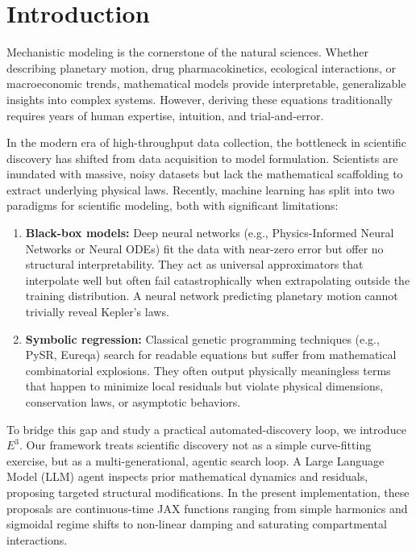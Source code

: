 \section{Introduction}
\label{sec:intro}

Mechanistic modeling is the cornerstone of the natural sciences. Whether describing planetary motion, drug pharmacokinetics, ecological interactions, or macroeconomic trends, mathematical models provide interpretable, generalizable insights into complex systems. However, deriving these equations traditionally requires years of human expertise, intuition, and trial-and-error.

In the modern era of high-throughput data collection, the bottleneck in scientific discovery has shifted from data acquisition to model formulation. Scientists are inundated with massive, noisy datasets but lack the mathematical scaffolding to extract underlying physical laws. Recently, machine learning has split into two paradigms for scientific modeling, both with significant limitations:

\begin{enumerate}
    \item \textbf{Black-box models:} Deep neural networks (e.g., Physics-Informed Neural Networks or Neural ODEs) fit the data with near-zero error but offer no structural interpretability. They act as universal approximators that interpolate well but often fail catastrophically when extrapolating outside the training distribution. A neural network predicting planetary motion cannot trivially reveal Kepler's laws.
    \item \textbf{Symbolic regression:} Classical genetic programming techniques (e.g., PySR, Eureqa) search for readable equations but suffer from mathematical combinatorial explosions. They often output physically meaningless terms that happen to minimize local residuals but violate physical dimensions, conservation laws, or asymptotic behaviors.
\end{enumerate}

To bridge this gap and study a practical automated-discovery loop, we introduce \textbf{$E^3$}. Our framework treats scientific discovery not as a simple curve-fitting exercise, but as a multi-generational, agentic search loop. A Large Language Model (LLM) agent inspects prior mathematical dynamics and residuals, proposing targeted structural modifications. In the present implementation, these proposals are continuous-time JAX functions ranging from simple harmonics and sigmoidal regime shifts to non-linear damping and saturating compartmental interactions.

